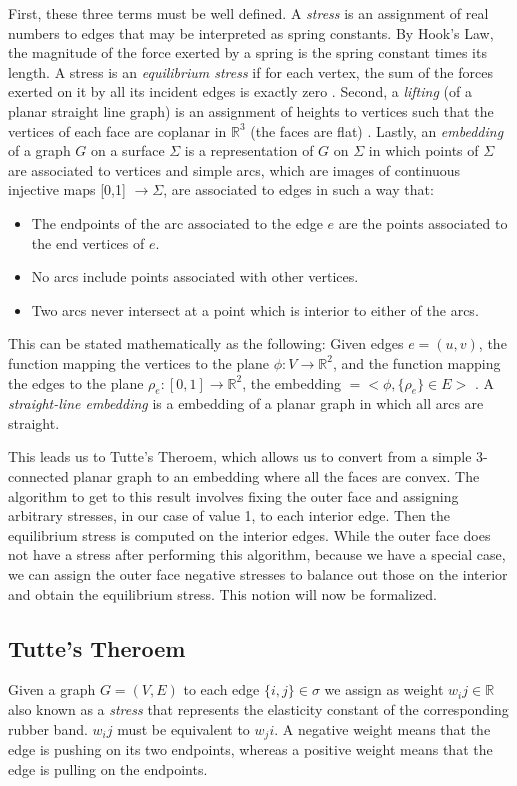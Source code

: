 \documentclass[11pt]{article}
\newcommand{\R}{\mathbb{R}}
\begin{document}
First, these three terms must be well defined. A \emph{stress} is an assignment of real numbers to edges that may be interpreted as spring constants. By Hook's Law, the magnitude of the force exerted by a spring is the spring constant times its length. A stress is an \emph{equilibrium stress} if for each vertex, the sum of the forces exerted on it by all its incident edges is exactly zero \cite{AresRiboMor}.
Second, a \emph{lifting} (of a planar straight line graph) is an assignment of heights to vertices such that the vertices of each face are coplanar in $\R^3$ (the faces are flat) \cite{WhiteleyHandbook}.
Lastly, an \emph{embedding} of a graph $G$ on a surface $\Sigma$ is a representation of $G$ on $\Sigma$ in which points of $\Sigma$ are associated to vertices and simple arcs, which are images of continuous injective maps [0,1] $\rightarrow \Sigma$, are associated to edges in such a way that:
  \begin{itemize}
	\item The endpoints of the arc associated to the edge $e$ are the points associated to the end vertices of $e$.
	\item No arcs include points associated with other vertices.
	\item Two arcs never intersect at a point which is interior to either of the arcs.
  \end{itemize}
  This can be stated mathematically as the following: Given edges $e=(u,v)$, the function mapping the vertices to the plane $ \phi :V \rightarrow \R^2$, and the function mapping the edges to the plane $ \rho_e :[0,1] \rightarrow \R^2$, the embedding $= <\phi, \{\rho_e\} \in E >$ \cite{mathworld:Embedding}.
 A \emph{straight-line embedding} is a embedding of a planar graph in which all arcs are straight.

This leads us to Tutte's Theroem, which allows us to convert from a simple 3-connected planar graph to an embedding where all the faces are convex. The algorithm to get to this result involves fixing the outer face and assigning arbitrary stresses, in our case of value 1, to each interior edge. Then the equilibrium stress is computed on the interior edges. While the outer face does not have a stress after performing this algorithm, because we have a special case, we can assign the outer face negative stresses to balance out those on the interior and obtain the equilibrium stress. This notion will now be formalized.

\subsection{Tutte's Theroem}
 Given a graph $G=(V,E)$ to each edge $\{i,j\}\in\sigma$ we assign as weight $w_ij\in\R$ also known as a \emph{stress} that represents the elasticity constant of the corresponding rubber band. $w_ij$ must be equivalent to $w_ji$. A negative weight means that the edge is pushing on its two endpoints, whereas a positive weight means that the edge is pulling on the endpoints. 
  
\end{document}
